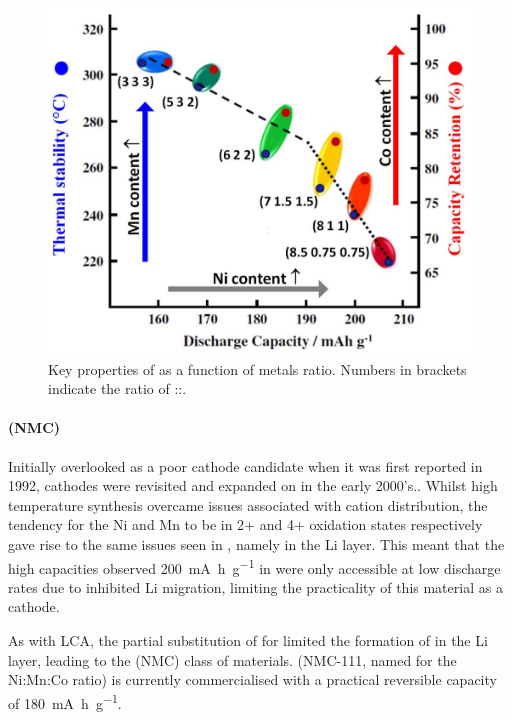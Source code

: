 \begin{figure}
\centering
\includegraphics[width=0.5\linewidth]{figures/static/NMC_composition}

\caption{Key properties of  as a function of metals ratio.\cite{Rozier2015, Noh2013} Numbers in brackets indicate the ratio of ::.} 
\label{fig:NMCcomp}
\end{figure}

\paragraph{ (NMC)}
Initially overlooked as a poor cathode candidate when it was first reported in 1992,\cite{Rossen1992}  cathodes were revisited and expanded on in the early 2000's.\cite{Lu2001,Yabuuchi2008, Venkatraman2004}.
Whilst high temperature synthesis overcame issues associated with cation distribution,\cite{Hinuma2007} the tendency for the Ni and Mn to be in 2+ and 4+ oxidation states respectively gave rise to the same issues seen in , namely  in the Li layer.
This meant that the high capacities observed \SI{200}{\milli\ampere\hour\per\gram} in  were only accessible at low discharge rates due to inhibited Li migration, limiting the practicality of this material as a cathode.

As with LCA, the partial substitution of  for  limited the formation of  in the Li layer, leading to the  (NMC) class of materials.
 (NMC-111, named for the Ni:Mn:Co ratio) is currently commercialised with a practical reversible capacity of \SI{180}{\milli\ampere\hour\per\gram}.

